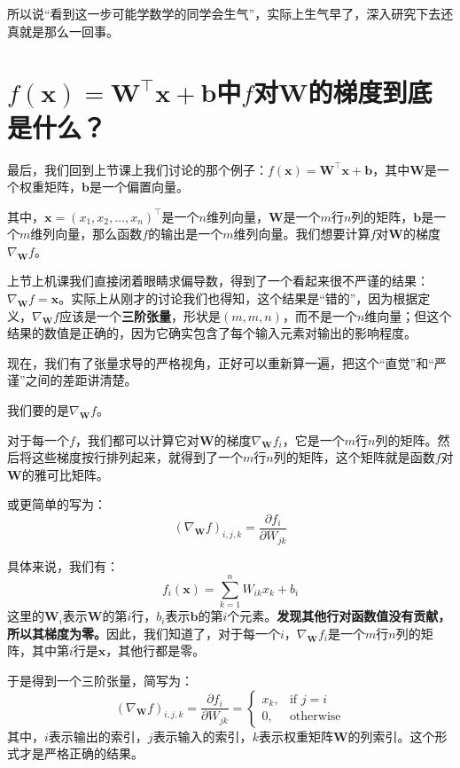 \documentclass[
    UTF8,
    a4paper,
    12pt
]{ctexart}
\begin{document}
所以说“看到这一步可能学数学的同学会生气”，实际上生气早了，深入研究下去还真就是那么一回事。

\section{$f(\mathbf{x})=\mathbf{W}^\top\mathbf{x}+\mathbf{b}$中$f$对$\mathbf{W}$的梯度到底是什么？}

最后，我们回到上节课上我们讨论的那个例子：$f(\mathbf{x})=\mathbf{W}^\top\mathbf{x}+\mathbf{b}$，其中$\mathbf{W}$是一个权重矩阵，$\mathbf{b}$是一个偏置向量。

其中，$\mathbf{x} = (x_1, x_2, \ldots, x_n)^\top$是一个$n$维列向量，$\mathbf{W}$是一个$m$行$n$列的矩阵，$\mathbf{b}$是一个$m$维列向量，那么函数$f$的输出是一个$m$维列向量。我们想要计算$f$对$\mathbf{W}$的梯度$\nabla_\mathbf{W} f$。

上节上机课我们直接闭着眼睛求偏导数，得到了一个看起来很不严谨的结果：$\nabla_\mathbf{W} f = \mathbf{x}$。实际上从刚才的讨论我们也得知，这个结果是“错的”，因为根据定义，$\nabla_\mathbf{W} f$应该是一个\textbf{三阶张量}，形状是$(m, m, n)$，而不是一个$n$维向量；但这个结果的数值是正确的，因为它确实包含了每个输入元素对输出的影响程度。

现在，我们有了张量求导的严格视角，正好可以重新算一遍，把这个“直觉”和“严谨”之间的差距讲清楚。

我们要的是$\nabla_\mathbf{W} f$。

对于每一个$f$，我们都可以计算它对$\mathbf{W}$的梯度$\nabla_{\mathbf{W}} f_i$，它是一个$m$行$n$列的矩阵。然后将这些梯度按行排列起来，就得到了一个$m$行$n$列的矩阵，这个矩阵就是函数$f$对$\mathbf{W}$的雅可比矩阵。

或更简单的写为：
\begin{equation}
    (\nabla_\mathbf{W} f)_{i, j, k} = \frac{\partial f_i}{\partial W_{jk}}
\end{equation}

具体来说，我们有：
\begin{equation}
    f_i(\mathbf{x}) = \sum_{k=1}^n W_{ik} x_k + b_i
\end{equation}
这里的$\mathbf{W}_i$表示$\mathbf{W}$的第$i$行，$b_i$表示$\mathbf{b}$的第$i$个元素。\textbf{发现其他行对函数值没有贡献，所以其梯度为零。}因此，我们知道了，对于每一个$i$，$\nabla_\mathbf{W} f_i$是一个$m$行$n$列的矩阵，其中第$i$行是$\mathbf{x}$，其他行都是零。

于是得到一个三阶张量，简写为：
\begin{equation}
    (\nabla_\mathbf{W} f)_{i, j, k} =  \frac{\partial f_i}{\partial W_{jk}} = \begin{cases}
        x_k, & \text{if } j = i \\
        0, & \text{otherwise}
    \end{cases}
\end{equation}
其中，$i$表示输出的索引，$j$表示输入的索引，$k$表示权重矩阵$\mathbf{W}$的列索引。这个形式才是严格正确的结果。
\end{document}
